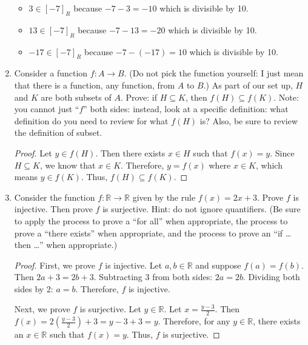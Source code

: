 \documentclass{article}
\begin{document}
\begin{enumerate}
\begin{itemize}
    \item $3 \in {[-7]}_R$ because $-7-3=-10$ which is divisible by 10. 
    \item $13 \in {[-7]}_R$ because $-7-13=-20$ which is divisible by 10. 
    \item $-17 \in {[-7]}_R$ because $-7-(-17)=10$ which is divisible by 10.
\end{itemize}

\newpage

\item 
Consider a function $f : A \to B$. (Do not pick the function yourself: I just mean that there is a function, any function, from $A$ to $B$.) As part of our set up, $H$ and $K$ are both subsets of $A$. Prove: if $H \subseteq K$, then $f(H) \subseteq f(K)$. Note: you cannot just ``$f$'' both sides: instead, look at a specific definition: what definition do you need to review for what $f(H)$ is? Also, be sure to review the definition of subset.

\begin{proof}
    Let $y \in f(H)$. Then there exists $x \in H$ such that $f(x)=y$.
    Since $H \subseteq K$, we know that $x \in K$.
    Therefore, $y=f(x)$ where $x \in K$, which means $y \in f(K)$.
    Thus, $f(H) \subseteq f(K)$.
\end{proof}

\newpage

\item 
Consider the function $f: \mathbb{R} \to \mathbb{R}$ given by the rule $f(x)=2x+3$. Prove $f$ is injective. Then prove $f$ is surjective. Hint: do not ignore quantifiers. (Be sure to apply the process to prove a ``for all'' when appropriate, the process to prove a ``there exists'' when appropriate, and the process to prove an ``if \dots then \dots'' when appropriate.)

\begin{proof}
    First, we prove $f$ is injective.
    Let $a,b \in \mathbb{R}$ and suppose $f(a)=f(b)$.
    Then $2a+3=2b+3$.
    Subtracting 3 from both sides: $2a=2b$.
    Dividing both sides by 2: $a=b$.
    Therefore, $f$ is injective.

    Next, we prove $f$ is surjective.
    Let $y \in \mathbb{R}$.
    Let $x=\frac{y-3}{2}$.
    Then $f(x)=2(\frac{y-3}{2})+3=y-3+3=y$.
    Therefore, for any $y \in \mathbb{R}$, there exists an $x \in \mathbb{R}$ such that $f(x)=y$.
    Thus, $f$ is surjective.
\end{proof}


\end{enumerate}
\end{document}
